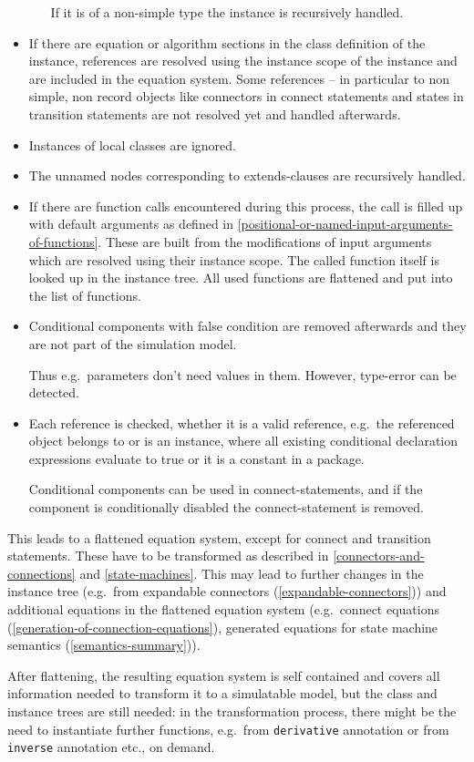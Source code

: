 \begin{itemize}
\begin{itemize}
    If it is of a non-simple type the instance is recursively handled.
  \end{itemize}
\item
  If there are equation or algorithm sections in the class definition of the instance, references are resolved using the instance scope of the instance and are included in the equation system.  Some references -- in particular to non simple, non record objects like connectors in connect statements and states in transition statements are not resolved yet and handled afterwards.
\item
  Instances of local classes are ignored.
\item
  The unnamed nodes corresponding to extends-clauses are recursively
  handled.
\item
  If there are function calls encountered during this process, the call
  is filled up with default arguments as defined in \cref{positional-or-named-input-arguments-of-functions}. These are
  built from the modifications of input arguments which are resolved
  using their instance scope. The called function itself is looked up in
  the instance tree. All used functions are flattened and put into the
  list of functions.
\item
  Conditional components with false condition are removed afterwards and
  they are not part of the simulation model.
  \begin{nonnormative}
  Thus e.g.\ parameters don't need values in them. However, type-error can be detected.
  \end{nonnormative}
\item
  Each reference is checked, whether it is a valid reference, e.g.\ the
  referenced object belongs to or is an instance, where all existing
  conditional declaration expressions evaluate to true or it is a
  constant in a package.
  \begin{nonnormative}
  Conditional components can be used in connect-statements, and if the component is conditionally disabled the connect-statement is removed.
  \end{nonnormative}
\end{itemize}

This leads to a flattened equation system, except for connect and transition statements. These have to be transformed as described in
\cref{connectors-and-connections} and \cref{state-machines}.  This may lead to further changes in the instance tree (e.g.\ from expandable connectors
(\cref{expandable-connectors})) and additional equations in the flattened equation system (e.g.\ connect equations (\cref{generation-of-connection-equations}),
generated equations for state machine semantics (\cref{semantics-summary})).

\begin{nonnormative}
After flattening, the resulting equation system is self
contained and covers all information needed to transform it to a
simulatable model, but the class and instance trees are still needed: in
the transformation process, there might be the need to instantiate
further functions, e.g.\ from \lstinline!derivative! annotation or from \lstinline!inverse!
annotation etc., on demand.
\end{nonnormative}
